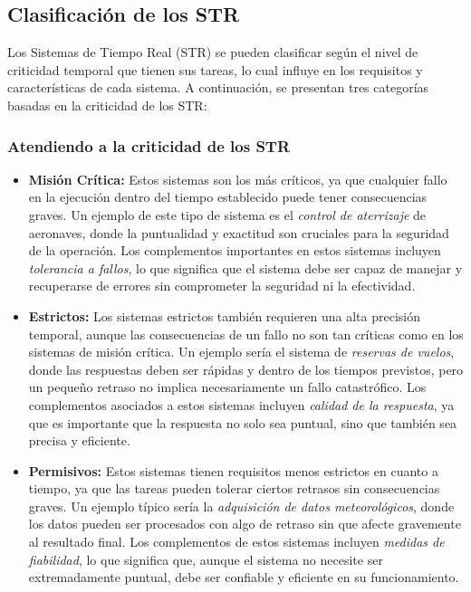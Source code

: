 \subsection{Clasificación de los STR}

Los Sistemas de Tiempo Real (STR) se pueden clasificar según el nivel de criticidad temporal que tienen sus tareas, lo cual influye en los requisitos y características de cada sistema. A continuación, se presentan tres categorías basadas en la criticidad de los STR:

\subsubsection{Atendiendo a la criticidad de los STR}

\begin{itemize}
    \item \textbf{Misión Crítica:} Estos sistemas son los más críticos, ya que cualquier fallo en la ejecución dentro del tiempo establecido puede tener consecuencias graves. Un ejemplo de este tipo de sistema es el \textit{control de aterrizaje} de aeronaves, donde la puntualidad y exactitud son cruciales para la seguridad de la operación. Los complementos importantes en estos sistemas incluyen \textit{tolerancia a fallos}, lo que significa que el sistema debe ser capaz de manejar y recuperarse de errores sin comprometer la seguridad ni la efectividad.
    
    \item \textbf{Estrictos:} Los sistemas estrictos también requieren una alta precisión temporal, aunque las consecuencias de un fallo no son tan críticas como en los sistemas de misión crítica. Un ejemplo sería el sistema de \textit{reservas de vuelos}, donde las respuestas deben ser rápidas y dentro de los tiempos previstos, pero un pequeño retraso no implica necesariamente un fallo catastrófico. Los complementos asociados a estos sistemas incluyen \textit{calidad de la respuesta}, ya que es importante que la respuesta no solo sea puntual, sino que también sea precisa y eficiente.
    
    \item \textbf{Permisivos:} Estos sistemas tienen requisitos menos estrictos en cuanto a tiempo, ya que las tareas pueden tolerar ciertos retrasos sin consecuencias graves. Un ejemplo típico sería la \textit{adquisición de datos meteorológicos}, donde los datos pueden ser procesados con algo de retraso sin que afecte gravemente al resultado final. Los complementos de estos sistemas incluyen \textit{medidas de fiabilidad}, lo que significa que, aunque el sistema no necesite ser extremadamente puntual, debe ser confiable y eficiente en su funcionamiento.
\end{itemize}

